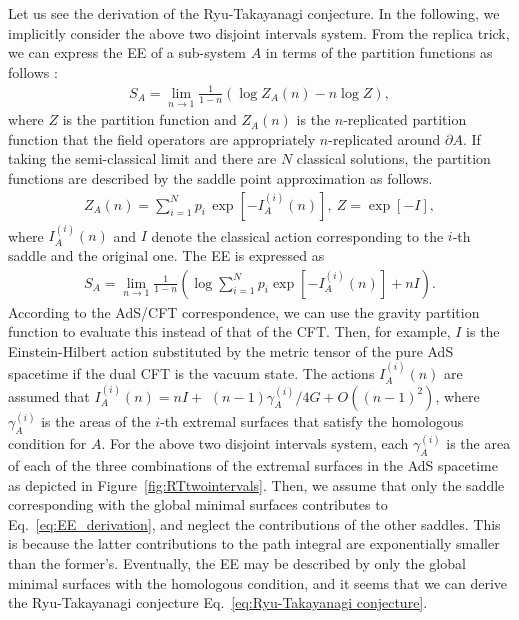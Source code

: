 \documentclass[%
 reprint,
 amsmath,amssymb,
 aps,
]{revtex4-2}
\begin{document}
    Let us see the derivation of the Ryu-Takayanagi conjecture. In the following, we implicitly consider the above two disjoint intervals system. From the replica trick, we can express the EE of a sub-system $A$ in terms of the partition functions as follows \cite{Calabrese:2009qy}:
\begin{align}
    S_A = \lim_{n \to 1} \frac{1}{1-n}\left( \log Z_A(n) - n \log Z \right),
\end{align}
    where $Z$ is the partition function and $Z_A(n)$ is the $n$-replicated partition function that the field operators are appropriately $n$-replicated around $\partial A$. If taking the semi-classical limit and there are $N$ classical solutions, the partition functions are described by the saddle point approximation as follows. 
\begin{gather}
    Z_A(n) = \sum_{i=1}^N p_i\, \exp\left[ - I_A^{(i)}(n) \right],\ 
    Z = \exp\left[- I \right],
\end{gather}
    where $I_A^{(i)}(n)$ and $I$ denote the classical action corresponding to the $i$-th saddle and the original one. The EE is expressed as 
\begin{gather}\label{eq:EE_derivation}
    S_A = \lim_{n \to 1}\frac{1}{1-n}\left( \log \sum_{i=1}^N p_i \exp\left[ -I_A^{(i)}(n) \right] + nI \right).
\end{gather}
    According to the AdS/CFT correspondence, we can use the gravity partition function to evaluate this instead of that of the CFT. Then, for example, $I$ is the Einstein-Hilbert action substituted by the metric tensor of the pure AdS spacetime if the dual CFT is the vacuum state. The actions $I_A^{(i)}(n)$ are assumed that $I_A^{(i)}(n) = n I +$  $(n-1)\gamma_A^{(i)}/4G + O((n-1)^2)$, where $\gamma_A^{(i)}$ is the areas of the $i$-th extremal surfaces that satisfy the homologous condition for $A$. For the above two disjoint intervals system, each $\gamma_A^{(i)}$ is the area of each of the three combinations of the extremal surfaces in the AdS spacetime as depicted in Figure~\ref{fig:RTtwointervals}. Then, we assume that only the saddle corresponding with the global minimal surfaces contributes to Eq.~\eqref{eq:EE_derivation}, and neglect the contributions of the other saddles. This is because the latter contributions to the path integral are exponentially smaller than the former's. Eventually, the EE may be described by only the global minimal surfaces with the homologous condition, and it seems that we can derive the Ryu-Takayanagi conjecture Eq.~\eqref{eq:Ryu-Takayanagi conjecture}.
\end{document}

